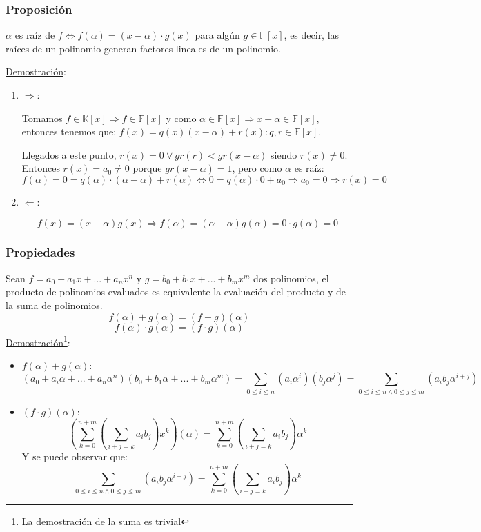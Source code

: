 \documentclass[10pt,a4paper,openright]{book}
\begin{document}
\subsubsection*{Proposición}
$\alpha$ es raíz de $f\Leftrightarrow f(\alpha)=(x-\alpha)\cdot g(x)$ para algún $g\in \mathbb F[x]$, es decir, las raíces de un polinomio generan factores lineales de un polinomio.\par
\underline{Demostración}:
\begin{enumerate}
\item $\Rightarrow$:\par
Tomamos $f\in \mathbb K[x]\Rightarrow f\in \mathbb F[x]$ y como $\alpha \in \mathbb F[x]\Rightarrow x-\alpha \in \mathbb F[x]$, entonces tenemos que: $f(x)=q(x)(x-\alpha)+r(x): q,r\in \mathbb F[x]$. \par
Llegados a este punto, $r(x)=0\vee gr(r)<gr(x-\alpha)$ siendo $r(x)\neq 0$. Entonces $r(x)=a_0\neq 0$ porque $gr(x-\alpha)=1$, pero como $\alpha$ es raíz:
$$f(\alpha)=0=q(\alpha)\cdot(\alpha-\alpha)+r(\alpha)\Leftrightarrow 0=q(\alpha)\cdot 0+ a_0\Rightarrow a_0=0\Rightarrow r(x)=0$$

\item $\Leftarrow$:\par
$$f(x)=(x-\alpha)g(x)\Rightarrow f(\alpha)=(\alpha-\alpha)g(\alpha)=0\cdot g(\alpha)=0$$
\end{enumerate}

\subsubsection*{Propiedades}
Sean $f=a_0+a_1x+...+a_nx^n$ y $g=b_0+b_1x+...+b_mx^m$ dos polinomios, el producto de polinomios evaluados es equivalente la evaluación del producto y de la suma de polinomios.
$$f(\alpha)+g(\alpha)=(f+g)(\alpha)$$
$$f(\alpha)\cdot g(\alpha)=(f\cdot g)(\alpha)$$ 
\underline{Demostración}\footnote{La demostración de la suma es trivial}:
\begin{itemize}
\item $f(\alpha)+g(\alpha)$:
$$(a_0+a_i\alpha +...+a_n\alpha ^n)(b_0+b_1\alpha +...+b_m\alpha ^m)=\sum_{0\leq i \leq n} (a_i\alpha ^i)(b_j\alpha ^j)=\sum_{0\leq i \leq n\wedge 0\leq j\leq m} (a_ib_j\alpha^{i+j})$$

\item $(f\cdot g)(\alpha)$:
$$\left(\sum_{k=0}^{n+m}\left(\sum_{i+j=k} a_ib_j\right)x^k\right)(\alpha)=\sum_{k=0}^{n+m}\left(\sum_{i+j=k} a_ib_j\right)\alpha^k$$
Y se puede observar que:
$$\sum_{0\leq i \leq n\wedge 0\leq j\leq m} (a_ib_j\alpha^{i+j})=\sum_{k=0}^{n+m}\left(\sum_{i+j=k} a_ib_j\right)\alpha^k$$
\end{itemize}
\end{document}
